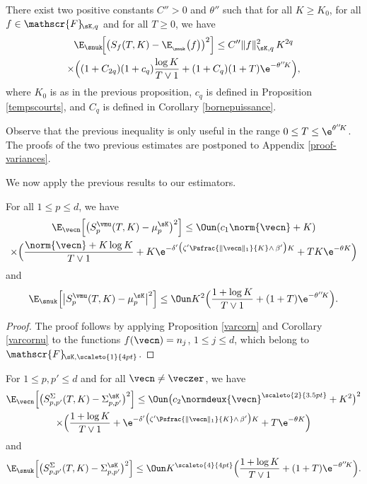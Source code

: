 \begin{corollary}\label{varcornu}
There exist two positive constants $C''>0$ and $\theta''$ such that
for all $K\geq K_0$, for all $f\in\mathscr{F}\!_{\sK,q}$ and for all $T\geq 0$, we have
\begin{multline*}
\E_{\snuk}\!\Bigl[\bigl(S_{f}(T,K)-\E_{_{\snuk}}\bigl(f\bigr)\bigr)^2\Bigr]\leq C'' \|f\|_{\sK,q}^2\, K^{2q}\\
\times \Bigl((1+C_{2q})(1+c_q)\frac{\log K}{T\vee 1}+ (1+C_q)(1+T) \e^{-\theta'' \! K} \Bigr),
\end{multline*}
where $K_0$ is as in the previous proposition, $c_q$ is defined in Proposition \ref{tempscourts}, and $C_q$ is defined in
Corollary \ref{bornepuissance}.
\end{corollary}
Observe that the previous inequality is only useful in the range $0\leq T \le \e^{\theta'' \! K}$.
The proofs of the two previous estimates are postponed to Appendix \ref{proof-variances}.

We now apply the previous results to our estimators.

\begin{proposition}
For all $1\leq p\leq d$, we have
\begin{multline*}
\E_{\vecn}\Bigl[\bigl(S^{\vmu}_p(T,K)-\mu_p^{\sK}\bigr)^2\Bigr]\le \Oun(c_1\norm{\vecn} +K)\\
\times
\Bigl(\frac{\norm{\vecn} +K \log K}{T\vee 1}+ K\e^{-\delta'\bigl(\zeta' \Psfrac{\|\vecn\|_{1}}{K}\wedge\, \beta'\bigr)K} + T K\e^{-\theta K} \Bigr)
\end{multline*}
and
\[
\E_{\snuk}\Bigl[\big|S^{\vmu}_p(T,K)-\mu_p^{\sK}\big|^2\Bigr]\le
\Oun K^2 \Bigl(\frac{1+\log K}{T\vee 1}+(1+T) \e^{-\theta''\! K} \Bigr).
\]
\end{proposition}

\begin{proof}
The proof follows by applying Proposition \ref{varcorn} and Corollary \ref{varcornu} to the functions $f(\vecn)=n_j$, $1\leq j\leq d$, which belong to $\mathscr{F}\!_{\sK,\scaleto{1}{4pt}}$.
\end{proof}

\begin{proposition}
\label{vs2}
For $1\leq p,p'\leq d$ and for all $\vecn\neq \veczer$, we have
\begin{multline*}
\E_{\vecn}\Bigl[\bigl(S^{{ \Sigma}}_{p,p'}(T,K)-\Sigma_{p,p'}^{\sK}\bigr)^2\Bigr]\le
\Oun \bigl(c_{2}\normdeux{\vecn}^{\scaleto{2}{3.5pt}} +K^2\bigr)^2\\ \times
\Bigl(
\frac{1+\log K}{T\vee 1}+ \e^{-\delta'\bigl(\zeta' \Psfrac{\|\vecn\|_{1}}{K}\wedge\, \beta'\bigr)K} + T \e^{-\theta K}
\Bigr)
\end{multline*}
and
\[
\E_{\snuk}\!\left[\bigl(S^{{ \Sigma}}_{p,p'}(T,K)-\Sigma_{p,p'}^{\sK}\bigr)^2\right]
\le \Oun K^{\scaleto{4}{4pt}} \Bigl(\frac{1+\log K}{T\vee 1}+(1+T) \e^{-\theta'' \!K} \Bigr).
\]
\end{proposition}

